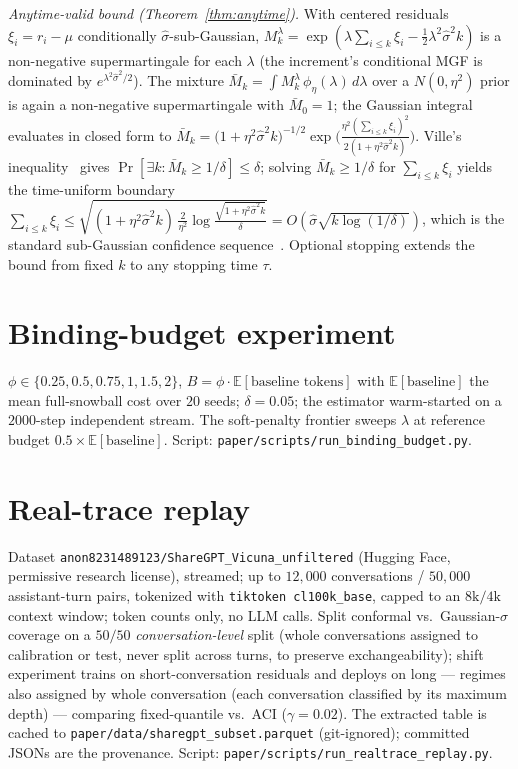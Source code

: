 \documentclass[11pt]{article}
\theoremstyle{plain}
\theoremstyle{definition}
\theoremstyle{remark}
\begin{document}
\emph{Anytime-valid bound (Theorem~\ref{thm:anytime}).} With centered residuals $\xi_i=r_i-\mu$ conditionally $\hat\sigma$-sub-Gaussian, $M_k^\lambda=\exp(\lambda\sum_{i\le k}\xi_i-\tfrac12\lambda^2\hat\sigma^2 k)$ is a non-negative supermartingale for each $\lambda$ (the increment's conditional MGF is dominated by $e^{\lambda^2\hat\sigma^2/2}$). The mixture $\bar M_k=\int M_k^\lambda\,\phi_\eta(\lambda)\,d\lambda$ over a $N(0,\eta^2)$ prior is again a non-negative supermartingale with $\bar M_0=1$; the Gaussian integral evaluates in closed form to $\bar M_k=\big(1+\eta^2\hat\sigma^2 k\big)^{-1/2}\exp\!\big(\tfrac{\eta^2 (\sum_{i\le k}\xi_i)^2}{2(1+\eta^2\hat\sigma^2 k)}\big)$. Ville's inequality~\cite{ramdas2023} gives $\Pr[\exists k:\bar M_k\ge1/\delta]\le\delta$; solving $\bar M_k\ge1/\delta$ for $\sum_{i\le k}\xi_i$ yields the time-uniform boundary $\sum_{i\le k}\xi_i\le\sqrt{(1+\eta^2\hat\sigma^2 k)\,\tfrac{2}{\eta^2}\log\!\frac{\sqrt{1+\eta^2\hat\sigma^2 k}}{\delta}}=O(\hat\sigma\sqrt{k\log(1/\delta)})$, which is the standard sub-Gaussian confidence sequence~\cite{howard2021}. Optional stopping extends the bound from fixed $k$ to any stopping time $\tau$.

\section{Binding-budget experiment}\label{app:binding}
$\phi\in\{0.25,0.5,0.75,1,1.5,2\}$, $B=\phi\cdot\mathbb{E}[\text{baseline tokens}]$ with $\mathbb{E}[\text{baseline}]$ the mean full-snowball cost over $20$ seeds; $\delta=0.05$; the estimator warm-started on a $2000$-step independent stream. The soft-penalty frontier sweeps $\lambda$ at reference budget $0.5\times\mathbb{E}[\text{baseline}]$. Script: \texttt{paper/scripts/run\_binding\_budget.py}.

\section{Real-trace replay}\label{app:realtrace}
Dataset \texttt{anon8231489123/ShareGPT\_Vicuna\_unfiltered} (Hugging Face, permissive research license), streamed; up to $12{,}000$ conversations / $50{,}000$ assistant-turn pairs, tokenized with \texttt{tiktoken cl100k\_base}, capped to an $8\text{k}/4\text{k}$ context window; token counts only, no LLM calls. Split conformal vs.\ Gaussian-$\sigma$ coverage on a $50/50$ \emph{conversation-level} split (whole conversations assigned to calibration or test, never split across turns, to preserve exchangeability); shift experiment trains on short-conversation residuals and deploys on long --- regimes also assigned by whole conversation (each conversation classified by its maximum depth) --- comparing fixed-quantile vs.\ ACI ($\gamma=0.02$). The extracted table is cached to \texttt{paper/data/sharegpt\_subset.parquet} (git-ignored); committed JSONs are the provenance. Script: \texttt{paper/scripts/run\_realtrace\_replay.py}.
\end{document}
